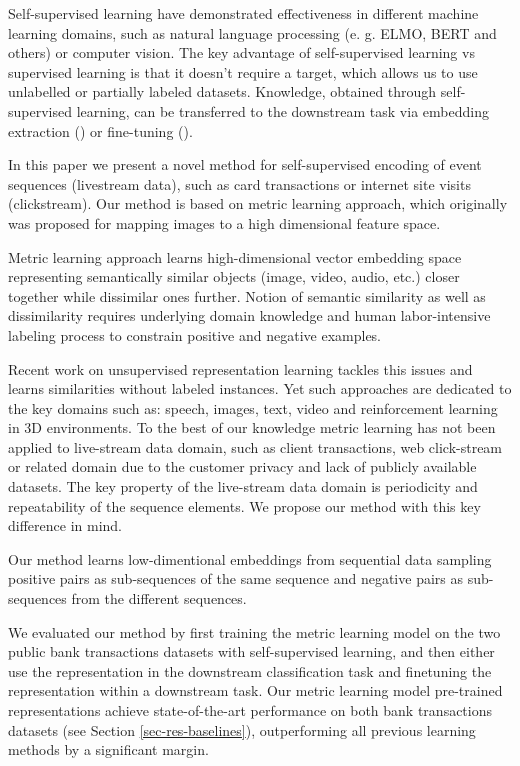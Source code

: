 \documentclass[sigconf]{acmart}
\begin{document}
Self-supervised learning have demonstrated effectiveness in different machine learning domains, such as natural language processing (e. g. ELMO\cite{ELMO2018}, BERT\cite{Devlin2019BERTPO} and others) or computer vision.  The key advantage of self-supervised learning vs supervised learning is that it doesn't require a target, which allows us to use unlabelled or partially labeled datasets. Knowledge, obtained through self-supervised learning, can be transferred to the downstream task via embedding extraction (\cite{word2vec}) or fine-tuning (\cite{Devlin2019BERTPO}).

In this paper we present a novel method for self-supervised encoding of event sequences (livestream data), such as card transactions or internet site visits (clickstream). Our method is based on metric learning approach, which originally was proposed for mapping images to a high dimensional feature space.

Metric learning approach learns high-dimensional vector embedding space representing semantically similar objects (image, video, audio, etc.) closer together while dissimilar ones further. Notion of semantic similarity as well as dissimilarity requires underlying domain knowledge and human labor-intensive labeling process to constrain positive and negative examples. 

Recent work on unsupervised representation learning  tackles this issues and learns similarities without labeled instances. Yet such approaches are dedicated to the key domains such as: speech, images, text, video and reinforcement learning in 3D environments. To the best of our knowledge metric learning has not been applied to live-stream data domain, such as client transactions, web click-stream or related domain due to the customer privacy and lack of publicly available datasets. The key property of the live-stream data domain is periodicity and repeatability of the sequence elements. We propose our method with this key difference in mind.

Our method learns low-dimentional embeddings from sequential data sampling positive pairs as sub-sequences of the same sequence and negative pairs as sub-sequences from the different sequences.

We evaluated our method by first training the metric learning model on the two public bank transactions datasets with self-supervised learning, and then either use the representation in the downstream classification task and finetuning the representation within a downstream task. Our metric learning model pre-trained representations achieve state-of-the-art performance on both bank transactions datasets (see Section \ref{sec-res-baselines}), outperforming all previous learning methods by a significant margin.
\end{document}
